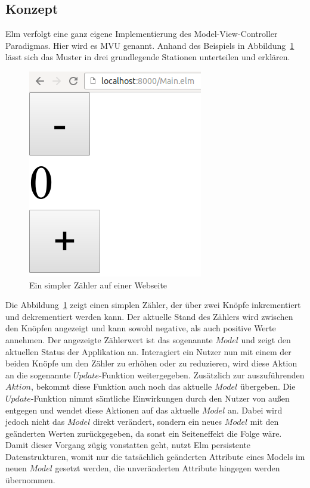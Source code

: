 \subsection{Konzept}
\label{sec:Konzept}
Elm verfolgt eine ganz eigene Implementierung des Model-View-Controller Paradigmas. Hier wird es \acf{MVU} genannt. Anhand des Beispiels in Abbildung~\ref{fig:counter} lässt sich das Muster in drei grundlegende Stationen unterteilen und erklären.
\begin{figure}[h]
	\centering  
	\includegraphics[scale=0.5]{img/counter.png}
	\caption{Ein simpler Zähler auf einer Webseite}\label{fig:counter}
\end{figure}
Die Abbildung~\ref{fig:counter} zeigt einen simplen Zähler, der über zwei Knöpfe inkrementiert und dekrementiert werden kann. Der aktuelle Stand des Zählers wird zwischen den Knöpfen angezeigt und kann sowohl negative, als auch positive Werte annehmen.
Der angezeigte Zählerwert ist das sogenannte $Model$ und zeigt den aktuellen Status der Applikation an. Interagiert ein Nutzer nun mit einem der beiden Knöpfe um den Zähler zu erhöhen oder zu reduzieren, wird diese Aktion an die sogenannte $Update$-Funktion weitergegeben. Zusätzlich zur auszuführenden $Aktion$, bekommt diese Funktion auch noch das aktuelle $Model$ übergeben.
Die $Update$-Funktion nimmt sämtliche Einwirkungen durch den Nutzer von außen entgegen und wendet diese Aktionen auf das aktuelle $Model$ an. Dabei wird jedoch nicht das $Model$ direkt verändert, sondern ein neues $Model$ mit den geänderten Werten zurückgegeben, da sonst ein Seiteneffekt die Folge wäre. Damit dieser Vorgang zügig vonstatten geht, nutzt Elm persistente Datenstrukturen, womit nur die tatsächlich geänderten Attribute eines Models im neuen $Model$ gesetzt werden, die unveränderten Attribute hingegen werden übernommen.
